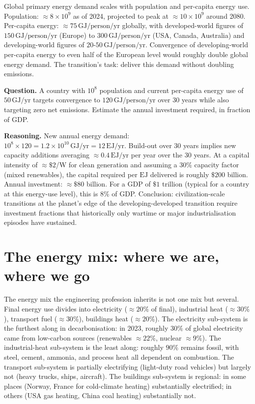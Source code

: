 \begin{archetype}
Global primary energy demand scales with population and per-capita energy use. Population: $\approx 8 \times 10^9$ as of 2024, projected to peak at $\approx 10 \times 10^9$ around 2080. Per-capita energy: $\approx 75\,\text{GJ/person/yr}$ globally, with developed-world figures of $150\,\text{GJ/person/yr}$ (Europe) to $300\,\text{GJ/person/yr}$ (USA, Canada, Australia) and developing-world figures of $20$-$50\,\text{GJ/person/yr}$. Convergence of developing-world per-capita energy to even half of the European level would roughly double global energy demand. The transition's task: deliver this demand without doubling emissions.
\end{archetype}

\begin{estimation}
\textbf{Question.} A country with $10^8$ population and current per-capita energy use of $50\,\text{GJ/yr}$ targets convergence to $120\,\text{GJ/person/yr}$ over 30 years while also targeting zero net emissions. Estimate the annual investment required, in fraction of GDP.

\textbf{Reasoning.} New annual energy demand: $10^8 \times 120 = 1.2 \times 10^{10}\,\text{GJ/yr} = 12\,\text{EJ/yr}$. Build-out over 30 years implies new capacity additions averaging $\approx 0.4\,\text{EJ/yr}$ per year over the 30 years. At a capital intensity of $\approx \$2$/W for clean generation and assuming a $30\%$ capacity factor (mixed renewables), the capital required per $\text{EJ}$ delivered is roughly $\$200$ billion. Annual investment: $\approx \$80$ billion. For a GDP of $\$1$ trillion (typical for a country at this energy-use level), this is $8\%$ of GDP. Conclusion: civilization-scale transitions at the planet's edge of the developing-developed transition require investment fractions that historically only wartime or major industrialisation episodes have sustained.
\end{estimation}

\section{The energy mix: where we are, where we go}

The energy mix the engineering profession inherits is not one mix but several. Final energy use divides into electricity ($\approx 20\%$ of final), industrial heat ($\approx 30\%$), transport fuel ($\approx 30\%$), buildings heat ($\approx 20\%$). The electricity sub-system is the furthest along in decarbonisation: in 2023, roughly $30\%$ of global electricity came from low-carbon sources (renewables $\approx 22\%$, nuclear $\approx 9\%$). The industrial-heat sub-system is the least along: roughly $90\%$ remains fossil, with steel, cement, ammonia, and process heat all dependent on combustion. The transport sub-system is partially electrifying (light-duty road vehicles) but largely not (heavy trucks, ships, aircraft). The buildings sub-system is regional: in some places (Norway, France for cold-climate heating) substantially electrified; in others (USA gas heating, China coal heating) substantially not.

